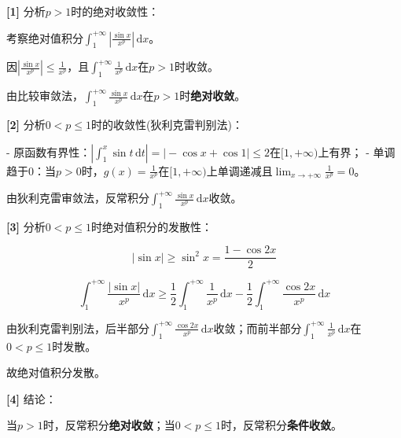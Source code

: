 \documentclass[11pt,a4paper,UTF8]{ctexart}
\begin{document}
\begin{solbox}[分步推导与答题规范]
\textbf{[1]} 分析$p > 1$时的绝对收敛性：

考察绝对值积分$\int_1^{+\infty} \left\vert{}\frac{\sin x}{x^p}\right\vert{}\,\mathrm{d}x$。

因$\left\vert{}\frac{\sin x}{x^p}\right\vert{} \le \frac{1}{x^p}$，且$\int_1^{+\infty} \frac{1}{x^p}\,\mathrm{d}x$在$p > 1$时收敛。

由比较审敛法，$\int_1^{+\infty} \frac{\sin x}{x^p}\,\mathrm{d}x$在$p > 1$时\textbf{绝对收敛}。

\textbf{[2]} 分析$0 < p \le 1$时的收敛性(狄利克雷判别法)：

- 原函数有界性：$\left\vert{}\int_1^x \sin t\,\mathrm{d}t\right\vert{} = \vert{}-\cos x + \cos 1\vert{} \le 2$在$[1, +\infty)$上有界；
- 单调趋于0：当$p > 0$时，$g(x) = \frac{1}{x^p}$在$[1, +\infty)$上单调递减且$\lim_{x \to +\infty} \frac{1}{x^p} = 0$。

由狄利克雷审敛法，反常积分$\int_1^{+\infty} \frac{\sin x}{x^p}\,\mathrm{d}x$收敛。

\textbf{[3]} 分析$0 < p \le 1$时绝对值积分的发散性：


\begin{equation*}
\vert{}\sin x\vert{} \ge \sin^2 x = \frac{1 - \cos 2x}{2}
\end{equation*}



\begin{equation*}
\int_1^{+\infty} \frac{\vert{}\sin x\vert{}}{x^p}\,\mathrm{d}x \ge \frac{1}{2}\int_1^{+\infty} \frac{1}{x^p}\,\mathrm{d}x - \frac{1}{2}\int_1^{+\infty} \frac{\cos 2x}{x^p}\,\mathrm{d}x
\end{equation*}


由狄利克雷判别法，后半部分$\int_1^{+\infty} \frac{\cos 2x}{x^p}\,\mathrm{d}x$收敛；而前半部分$\int_1^{+\infty} \frac{1}{x^p}\,\mathrm{d}x$在$0 < p \le 1$时发散。

故绝对值积分发散。

\textbf{[4]} 结论：

当$p > 1$时，反常积分\textbf{绝对收敛}；当$0 < p \le 1$时，反常积分\textbf{条件收敛}。
\end{solbox}
\end{document}
